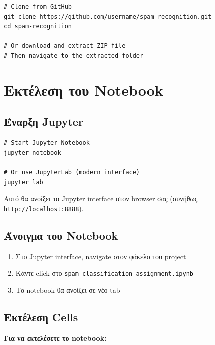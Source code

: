 \documentclass[12pt,a4paper,twoside]{book}
\begin{document}
\begin{tcolorbox}[myCustomStyle={Clone Repository}]
    \begin{lstlisting}[style=myPythonStyle]
# Clone from GitHub
git clone https://github.com/username/spam-recognition.git
cd spam-recognition

# Or download and extract ZIP file
# Then navigate to the extracted folder
\end{lstlisting}
\end{tcolorbox}

\section{Εκτέλεση του Notebook}

\subsection{Έναρξη Jupyter}

\begin{tcolorbox}[myCustomStyle={Start Jupyter}]
    \begin{lstlisting}[style=myPythonStyle]
# Start Jupyter Notebook
jupyter notebook

# Or use JupyterLab (modern interface)
jupyter lab
\end{lstlisting}
\end{tcolorbox}

Αυτό θα ανοίξει το Jupyter interface στον browser σας (συνήθως \texttt{http://localhost:8888}).

\subsection{Άνοιγμα του Notebook}

\begin{enumerate}
    \item Στο Jupyter interface, navigate στον φάκελο του project
    \item Κάντε click στο \texttt{spam\_classification\_assignment.ipynb}
    \item Το notebook θα ανοίξει σε νέο tab
\end{enumerate}

\subsection{Εκτέλεση Cells}

\textbf{Για να εκτελέσετε το notebook:}
\end{document}
